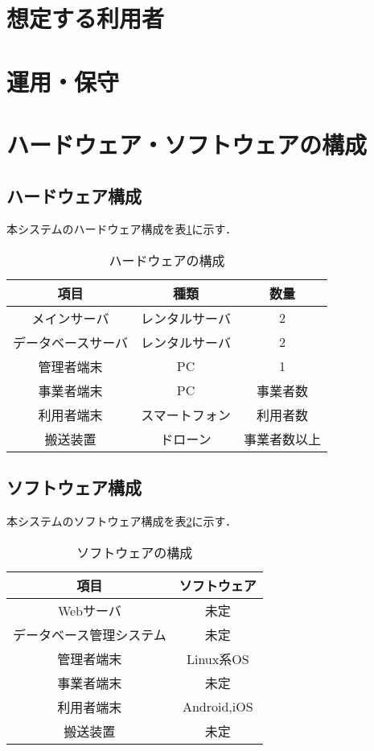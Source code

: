 \documentclass[a4paper, titlepage]{jsarticle}
\begin{document}
\section{想定する利用者}

\section{運用・保守}

\section{ハードウェア・ソフトウェアの構成}
\subsection{ハードウェア構成}
本システムのハードウェア構成を表\ref{fig:hardware}に示す．
\begin{table}[H]
 \begin{center}
  \caption{ハードウェアの構成}
    \label{fig:hardware}
  \begin{tabular}{ccc} \hline
    項目 & 種類 & 数量 \\ \hline \hline
    メインサーバ & レンタルサーバ & 2 \\
    データベースサーバ & レンタルサーバ & 2 \\
    管理者端末 & PC & 1 \\
    事業者端末 & PC & 事業者数 \\
    利用者端末 & スマートフォン & 利用者数 \\
    搬送装置 & ドローン & 事業者数以上 \\ \hline
  \end{tabular}
 \end{center}
\end{table}
\subsection{ソフトウェア構成}
本システムのソフトウェア構成を表\ref{fig:software}に示す．
\begin{table}[H]
 \begin{center}
  \caption{ソフトウェアの構成}
    \label{fig:software}
  \begin{tabular}{cc} \hline
    項目 & ソフトウェア \\ \hline \hline
    Webサーバ & 未定 \\
    データベース管理システム & 未定 \\
    管理者端末 & Linux系OS \\
    事業者端末 & 未定 \\
    利用者端末 & Android,iOS \\
    搬送装置 & 未定 \\ \hline
  \end{tabular}
 \end{center}
\end{table}
\end{document}
